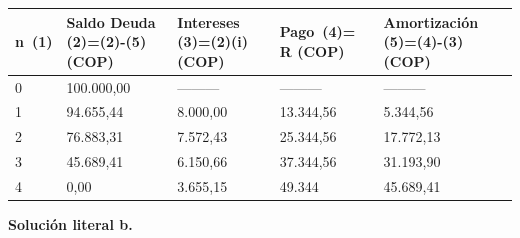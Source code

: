 	\begin{center}
	\begin{spacing}{1.1}
		\begin{tabular}{|p{1cm}|p{2cm}|p{2cm}|p{2cm}|p{3cm}|}
			\hline
			\rowcolor{white!50}
			\textbf{n\ (1)} & \textbf{Saldo Deuda (2)=(2)-(5) (COP)} & \textbf{Intereses  (3)=(2)(i) (COP)} & \textbf{Pago\ (4)=  R (COP)} & \textbf{Amortización  (5)=(4)-(3)(COP)} \\ \hline
			
			0               &   100{.}000,00                     & ---------                      & ---------               & ---------                          \\ \hline
			1               &   94{.}655,44                      &   8{.}000,00                     &   13{.}344,56             &   5{.}344,56                         \\ \hline
			2               &   76{.}883,31                      &   7{.}572,43                     &   25{.}344,56             &   17{.}772,13                        \\ \hline
			3               &   45{.}689,41                      &   6{.}150,66                     &   37{.}344,56             &   31{.}193,90                        \\ \hline
			4               &   0,00                           &  3{.}655,15                     &   49{.}344            &   45{.}689,41                        \\ \hline
		\end{tabular}
	\end{spacing}
	\end{center}

\begin{flushleft}
	\textbf{Solución literal b.}\\
\end{flushleft}

